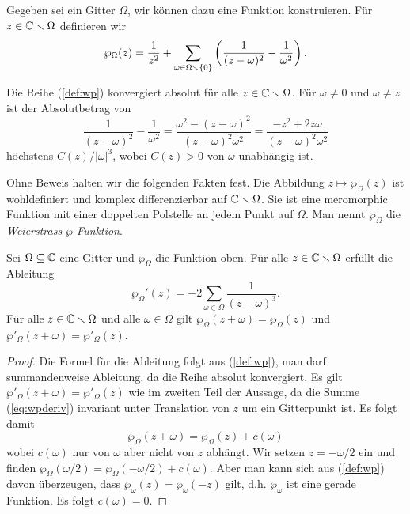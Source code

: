 Gegeben sei ein Gitter $\Omega$, wir können dazu eine Funktion
konstruieren. Für $z\in {\mathbb{C}}\smallsetminus\Omega$ definieren wir
\begin{equation}
  \label{def:wp}
  \wp_\Omega(z) = \frac{1}{z^2} + \sum_{\omega\in \Omega\smallsetminus\{0\}}
  \left(\frac{1}{(z-\omega)^2} - \frac{1}{\omega^2}\right).
\end{equation}

\begin{bemerkung}
  Die Reihe (\ref{def:wp}) konvergiert absolut für alle
  $z\in{\mathbb{C}}\smallsetminus\Omega$.
  Für $\omega\not=0$ und
  $\omega\not=z$ ist der
  Absolutbetrag von 
  \begin{equation*}
    \frac{1}{(z-\omega)^2} - \frac{1}{\omega^2} =
    \frac{\omega^2 - (z-\omega)^2}{(z-\omega)^2\omega^2}
    =\frac{-z^2 + 2z\omega}{(z-\omega)^2\omega^2}
  \end{equation*}
  höchstens $C(z)/|\omega|^3$, wobei $C(z)>0$ von $\omega$ unabhängig
  ist. 
\end{bemerkung}

Ohne Beweis halten wir die folgenden Fakten fest.
Die Abbildung $z\mapsto \wp_\Omega(z)$ ist wohldefiniert und komplex
differenzierbar auf ${\mathbb{C}}\smallsetminus\Omega$. Sie ist eine meromorphic Funktion
mit einer doppelten Polstelle an jedem Punkt auf $\Omega$. 
Man nennt $\wp_\Omega$ die \emph{Weierstrass-$\wp$
  Funktion}.

\begin{lemma}
  Sei $\Omega \subseteq{\mathbb{C}}$ eine Gitter und $\wp_\Omega$ die Funktion
  oben. Für alle $z\in{\mathbb{C}}\smallsetminus\Omega$ erfüllt die Ableitung
  \begin{equation}
    \label{eq:wpderiv}
    \wp_\Omega'(z) = -2 \sum_{\omega\in\Omega} \frac{1}{(z-\omega)^3}.
  \end{equation}
  Für alle $z\in{\mathbb{C}}\smallsetminus\Omega$ und alle  $\omega\in\Omega$
  gilt $\wp_\Omega(z+\omega) = \wp_\Omega(z)$ und
  $\wp'_\Omega(z+\omega) = \wp'_\Omega(z)$.
\end{lemma}
\begin{proof}
  Die Formel für die Ableitung folgt aus (\ref{def:wp}), man darf
  summandenweise Ableitung, da die Reihe absolut konvergiert. Es gilt
  $\wp'_\Omega(z+\omega) = \wp'_\Omega(z)$ wie im zweiten Teil der
  Aussage, da die Summe (\ref{eq:wpderiv}) invariant unter Translation
  von $z$ um ein Gitterpunkt ist.
  Es folgt damit
  $$
  \wp_\Omega(z+\omega) = \wp_\Omega(z) + c(\omega)
  $$
  wobei $c(\omega)$ nur von $\omega$ aber nicht von $z$ abhängt.
  Wir setzen $z=-\omega/2$ ein und finden
  $\wp_\Omega(\omega/2) = \wp_\Omega(-\omega/2) + c(\omega)$.
  Aber man kann sich aus (\ref{def:wp}) davon überzeugen, dass
  $\wp_\omega(z)=\wp_\omega(-z)$ gilt, d.h. $\wp_\omega$ ist eine
  gerade Funktion. Es folgt $c(\omega)=0$. 
\end{proof}

